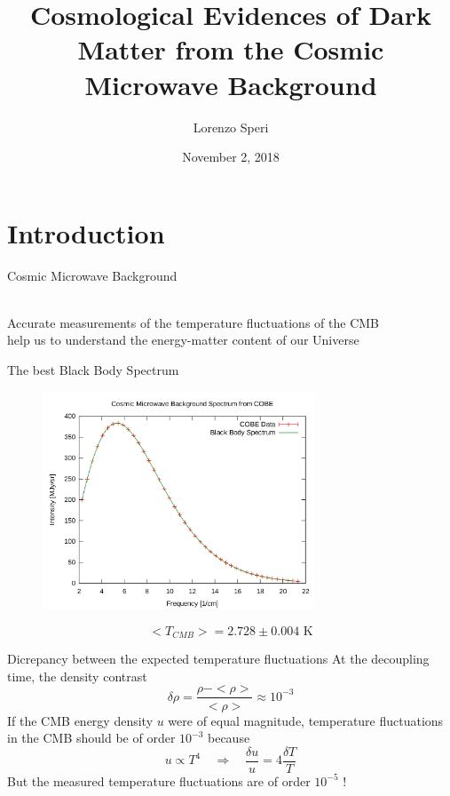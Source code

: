 \documentclass{beamer}
\title[University of Heidelberg]{Cosmological Evidences of Dark Matter from the Cosmic Microwave Background}
\author{Lorenzo Speri}
\date{November 2, 2018}
\begin{document}
\begin{frame}
  \titlepage
\end{frame}


\section{Introduction}

\begin{frame}{Cosmic Microwave Background}
  


\begin{center}
\\
Accurate measurements of the temperature fluctuations of the CMB\\ help  us to understand the energy-matter content of our Universe

\end{center}
\end{frame}

\begin{frame}{The best Black Body Spectrum}
\begin{figure}
   \includegraphics[height=6.5cm]{blackbody.png}
\end{figure}
$$<T_{CMB}> = 2.728 \pm 0.004 \text{ K}$$ 
\end{frame}

\begin{frame}{Dicrepancy between the expected temperature fluctuations}
At the decoupling time, the density contrast 
\[
\delta \rho = \frac{\rho - <\rho>}{<\rho>} \approx 10^{-3}
\]
If the CMB energy density $u$ were of equal magnitude, temperature fluctuations in the CMB should be of order $10^{-3}$ because
\[
u \propto T^4 \quad \Rightarrow \quad \frac{\delta u}{u} = 4 \frac{\delta T}{T}
\]
But the measured temperature fluctuations are of order $10^{-5}$ !
\end{frame}
\end{document}
